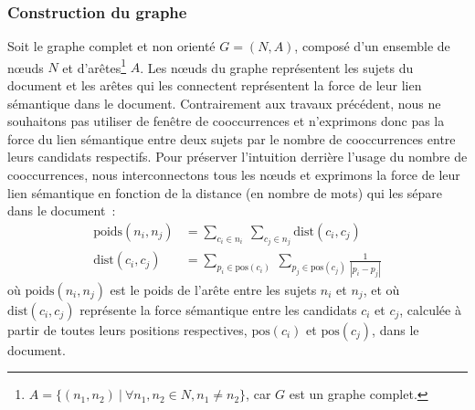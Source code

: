       \subsubsection{Construction du graphe}
      \label{subsubsec:main:domain_independent_keyphrase_extraction-unsupervised_automatic_keyphrase_extraction-topicrank-graph_construction}
        Soit le graphe complet et non orienté $G = (N, A)$, composé d'un
        ensemble de n\oe{}uds $N$ et d'arêtes\footnote{$A = \{(n_1, n_2)\ |\
        \forall{n_1, n_2 \in N}, n_1 \neq n_2\}$, car $G$ est un graphe
        complet.} $A$. Les n\oe{}uds du graphe représentent les sujets du
        document et les arêtes qui les connectent représentent la force de leur
        lien sémantique dans le document. Contrairement aux travaux précédent,
        nous ne souhaitons pas utiliser de fenêtre de cooccurrences et
        n'exprimons donc pas la force du lien sémantique entre deux sujets par
        le nombre de cooccurrences entre leurs candidats respectifs. Pour
        préserver l'intuition derrière l'usage du nombre de cooccurrences, nous
        interconnectons tous les n\oe{}uds et exprimons la force de leur
        lien sémantique en fonction de la distance (en nombre de mots) qui les
        sépare dans le document~:
        \begin{align}
          \text{poids}(n_i, n_j) &= \sum_{c_i \in n_i}\ \sum_{c_j \in n_j} \text{dist}(c_i, c_j) \label{math:ponderation}\\
          \text{dist}(c_i, c_j) &= \sum_{p_i \in \text{pos}(c_i)}\ \sum_{p_j \in \text{pos}(c_j)} \frac{1}{|p_i - p_j|} \label{math:distance}
        \end{align}
        où $\text{poids}(n_i, n_j)$ est le poids de l'arête entre les sujets
        $n_i$ et $n_j$, et où $\text{dist}(c_i, c_j)$ représente la force
        sémantique entre les candidats $c_i$ et $c_j$, calculée à partir de
        toutes leurs positions respectives, $\text{pos}(c_i)$ et
        $\text{pos}(c_j)$, dans le document.

